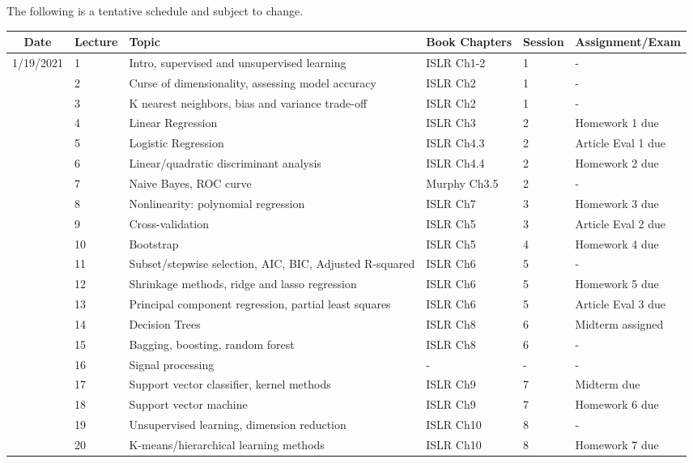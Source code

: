 \documentclass[11pt]{article}
\begin{document}
The following is a tentative schedule and subject to change.
\begin{center}
\begin{tabular}{c|m{3em}|m{21em}|m{7em}|m{3em}|m{8em}}
Date & Lecture & Topic & Book Chapters & Session & Assignment/Exam\\
\hline
1/19/2021 & 1 & Intro, supervised and unsupervised learning & ISLR Ch1-2 &  1 & - \\ \hline
 & 2 & Curse of dimensionality, assessing model accuracy & ISLR Ch2 &  1 & - \\ \hline
 & 3 & K nearest neighbors, bias and variance trade-off  & ISLR Ch2 &  1 & - \\ \hline
 & 4 & Linear Regression & ISLR Ch3 &  2 & Homework 1 due \\ \hline
 & 5 & Logistic Regression & ISLR Ch4.3 &  2 & Article Eval 1 due \\ \hline
 & 6 & Linear/quadratic discriminant analysis & ISLR Ch4.4 &  2 & Homework 2 due \\ \hline
 & 7 & Naive Bayes, ROC curve & Murphy Ch3.5 &  2 & - \\ \hline
 & 8 & Nonlinearity: polynomial regression & ISLR Ch7 & 3 & Homework 3 due \\ \hline
 & 9 & Cross-validation & ISLR Ch5 &  3 & Article Eval 2 due\\ \hline
 & 10 & Bootstrap & ISLR Ch5 &  4 & Homework 4 due \\ \hline
 & 11 &  Subset/stepwise selection, AIC, BIC, Adjusted R-squared & ISLR Ch6 &  5 & - \\ \hline
 & 12 & Shrinkage methods, ridge and lasso regression & ISLR Ch6 & 5 & Homework 5 due \\ \hline
 & 13 & Principal component regression, partial least squares & ISLR Ch6 & 5 & Article Eval 3 due\\ \hline
 & 14 & Decision Trees & ISLR Ch8 & 6 & Midterm assigned \\ \hline
 & 15 & Bagging, boosting, random forest & ISLR Ch8 & 6 & - \\ \hline
 & 16 & Signal processing & - & - & - \\ \hline
 & 17 & Support vector classifier, kernel methods & ISLR Ch9 & 7 & Midterm due \\ \hline
 & 18 & Support vector machine & ISLR Ch9 &  7 & Homework 6 due\\ \hline
 & 19 & Unsupervised learning, dimension reduction & ISLR Ch10 & 8 & - \\ \hline
 & 20 & K-means/hierarchical learning methods & ISLR Ch10 &  8 & Homework 7 due \\ \hline

\end{tabular}
\end{center}
\end{document}
